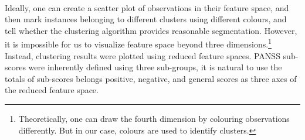 \documentclass[11pt]{article}
\begin{document}
	\paragraph{} Ideally, one can create a scatter plot of observations in their feature space, and then mark instances belonging to different clusters using different colours, and tell whether the clustering algorithm provides reasonable segmentation. However, it is impossible for us to visualize feature space beyond three dimensions.\footnote{Theoretically, one can draw the fourth dimension by colouring observations differently. But in our case, colours are used to identify clusters.} Instead, clustering results were plotted using reduced feature spaces. PANSS sub-scores were inherently defined using three sub-groups, it is natural to use the totals of sub-scores belongs positive, negative, and general scores as three axes of the reduced feature space.
\end{document}
